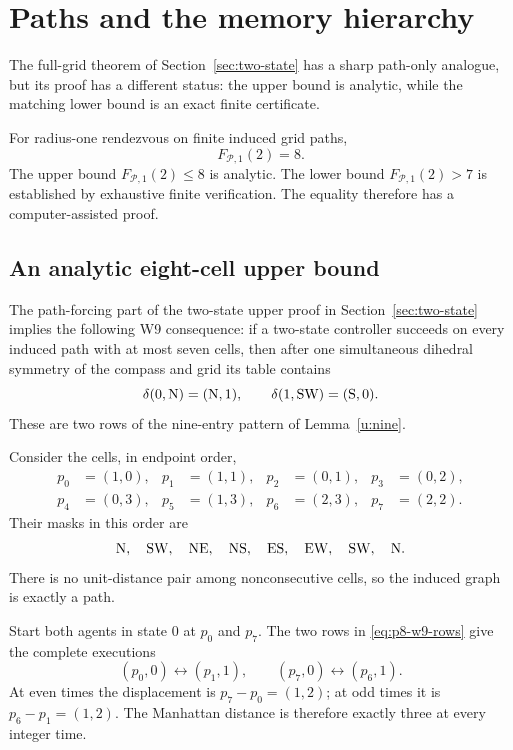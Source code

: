 \section{Paths and the memory hierarchy}\label{sec:paths}

The full-grid theorem of Section~\ref{sec:two-state} has a sharp path-only analogue, but its proof has a different status: the upper bound is analytic, while the matching lower bound is an exact finite certificate.

\begin{theorem}\label{thm:path-two-state}
For radius-one rendezvous on finite induced grid paths,
\[
 \boxed{F_{\mathcal P,1}(2)=8.}
\]
The upper bound $F_{\mathcal P,1}(2)\le8$ is analytic. The lower bound $F_{\mathcal P,1}(2)>7$ is established by exhaustive finite verification. The equality therefore has a computer-assisted proof.
\end{theorem}

\subsection{An analytic eight-cell upper bound}

The path-forcing part of the two-state upper proof in Section~\ref{sec:two-state} implies the following W9 consequence: if a two-state controller succeeds on every induced path with at most seven cells, then after one simultaneous dihedral symmetry of the compass and grid its table contains
\begin{equation}\label{eq:p8-w9-rows}
 \delta(0,\mathrm{N})=(\mathrm{N},1),
 \qquad
 \delta(1,\mathrm{S}\mathrm{W})=(\mathrm{S},0).
\end{equation}
These are two rows of the nine-entry pattern of Lemma~\ref{u:nine}.

Consider the cells, in endpoint order,
\begin{equation}\label{eq:p8-coordinates}
\begin{aligned}
 p_0&=(1,0),& p_1&=(1,1),& p_2&=(0,1),& p_3&=(0,2),\\
 p_4&=(0,3),& p_5&=(1,3),& p_6&=(2,3),& p_7&=(2,2).
\end{aligned}
\end{equation}
Their masks in this order are
\[
 \mathrm{N},\quad \mathrm{S}\mathrm{W},\quad \mathrm{N}\mathrm{E},\quad \mathrm{N}\mathrm{S},
 \quad \mathrm{E}\mathrm{S},\quad \mathrm{E}\mathrm{W},\quad \mathrm{S}\mathrm{W},\quad \mathrm{N}.
\]
There is no unit-distance pair among nonconsecutive cells, so the induced graph is exactly a path.

Start both agents in state $0$ at $p_0$ and $p_7$.  The two rows in \eqref{eq:p8-w9-rows} give the complete executions
\[
 (p_0,0)\longleftrightarrow(p_1,1),
 \qquad
 (p_7,0)\longleftrightarrow(p_6,1).
\]
At even times the displacement is $p_7-p_0=(1,2)$; at odd times it is $p_6-p_1=(1,2)$.  The Manhattan distance is therefore exactly three at every integer time.

